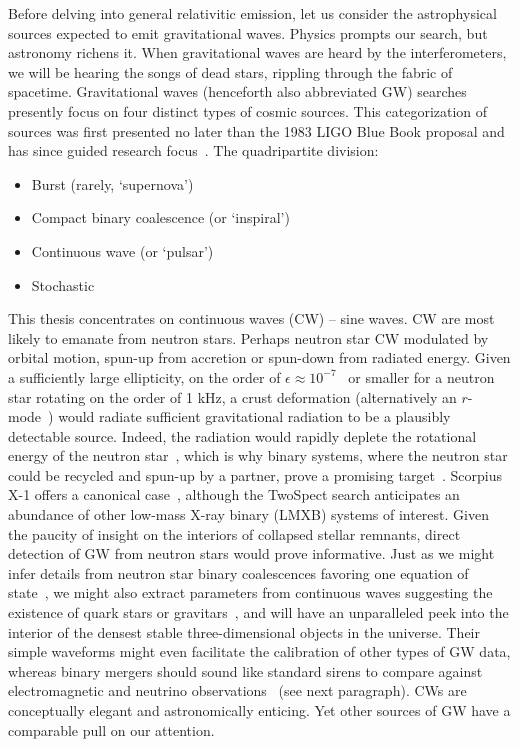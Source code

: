 Before delving into general relativitic emission, let us consider the astrophysical sources expected to emit gravitational waves. 
Physics prompts our search, but astronomy richens it.
When gravitational waves are heard by the interferometers, we will be hearing the songs of dead stars, rippling through the fabric of spacetime.  
Gravitational waves (henceforth also abbreviated GW) searches presently focus on four distinct types of cosmic sources.
This categorization of sources was first presented no later than the 1983 LIGO Blue Book proposal and has since guided research focus~\cite{CollinsGravityShadow,Schutz1989}. 
The quadripartite division:
\begin{itemize}
\item Burst (rarely, `supernova')
\item Compact binary coalescence (or `inspiral')
\item Continuous wave (or `pulsar')
\item Stochastic
\end{itemize}

This thesis concentrates on continuous waves (CW) -- sine waves. 
CW are most likely to emanate from neutron stars. 
Perhaps neutron star CW modulated by orbital motion, spun-up from accretion or spun-down from radiated energy. 
Given a sufficiently large ellipticity, on the order of $\epsilon \approx 10^{-7}$~\cite{Owen2005} or smaller for a neutron star rotating on the order of 1 kHz, a crust deformation (alternatively an $r$-mode~\cite{Owen1998,Owen2010}) would radiate sufficient gravitational radiation to be a plausibly detectable source. 
Indeed, the radiation would rapidly deplete the rotational energy of the neutron star~\cite{Owen1998}, which is why binary systems, where the neutron star could be recycled and spun-up by a partner, prove a promising target~\cite{PapaloizouPringle1978,Wagoner1984}. 
Scorpius X-1 offers a canonical case~\cite{AbbottScoX12007}, although the TwoSpect search anticipates an abundance of other low-mass X-ray binary (LMXB) systems of interest. 
Given the paucity of insight on the interiors of collapsed stellar remnants, direct detection of GW from neutron stars would prove informative. 
Just as we might infer details from neutron star binary coalescences favoring one equation of state~\cite{Lattimer2007,Read2009}, we might also extract parameters from continuous waves suggesting the existence of quark stars or gravitars~\cite{Owen2005}, and will have an unparalleled peek into the interior of the densest stable three-dimensional objects in the universe. 
Their simple waveforms might even facilitate the calibration of other types of GW data, whereas binary mergers should sound like standard sirens to compare against electromagnetic and neutrino observations~\cite{Punturo2010}
(see next paragraph).
CWs are conceptually elegant and astronomically enticing.
Yet other sources of GW have a comparable pull on our attention. 

